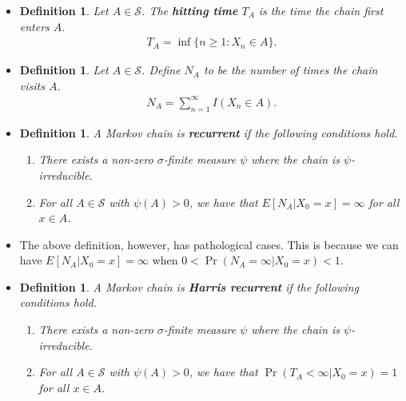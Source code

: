 \documentclass[10pt]{article}
\newtheorem{definition}[lemma]{Definition}
\newcommand{\mcal}[1]{\mathcal{#1}}
\begin{document}
\begin{itemize}
  \item \begin{definition}
    Let $A \in \mcal{S}$. The {\bf hitting time} $T_A$ is the time the chain first enters $A$.
    \begin{align*}
      T_A = \inf \{ n\geq 1 : X_n \in A \}.
    \end{align*}
  \end{definition}

  \item \begin{definition}
    Let $A \in \mcal{S}$. Define $N_A$ to be the number of times the chain visits $A$.
    \begin{align*}
      N_A = \sum_{n=1}^\infty I(X_n \in A).
    \end{align*}
  \end{definition}

  \item \begin{definition}
    A Markov chain is {\bf recurrent} if the following conditions hold.
    \begin{enumerate}
      \item[(a)] There exists a non-zero $\sigma$-finite measure $\psi$ where the chain is $\psi$-irreducible.
      \item[(b)] For all $A \in \mcal{S}$ with $\psi(A) > 0$, we have that $E[N_A | X_0 = x] = \infty$ for all $x \in A$.
    \end{enumerate}
  \end{definition}

  \item The above definition, however, has pathological cases. This is because we can have $E[N_A|X_0 = x] = \infty$ when $0 < \Pr(N_A = \infty | X_0 = x) < 1$.
  
  \item \begin{definition}
    A Markov chain is {\bf Harris recurrent} if the following conditions hold.
    \begin{enumerate}
      \item[(a)] There exists a non-zero $\sigma$-finite measure $\psi$ where the chain is $\psi$-irreducible.
      \item[(b)] For all $A \in \mcal{S}$ with $\psi(A) > 0$, we have that $\Pr(T_A < \infty|X_0 = x) = 1$ for all $x \in A$.
    \end{enumerate}    
  \end{definition}


\end{itemize}
\end{document}
